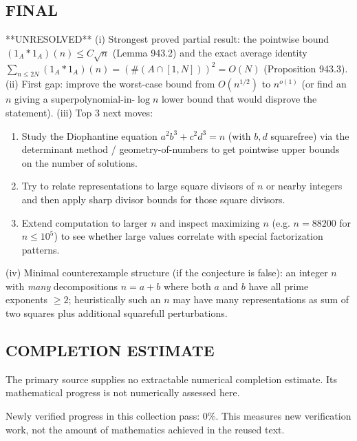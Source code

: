 \subsection*{FINAL}
**UNRESOLVED**
(i) Strongest proved partial result: the pointwise bound $(1_A*1_A)(n)\le C\sqrt{n}$ (Lemma 943.2) and the exact average identity $\sum_{n\le 2N}(1_A*1_A)(n)=(\#(A\cap[1,N]))^2=O(N)$ (Proposition 943.3).
(ii) First gap: improve the worst-case bound from $O(n^{1/2})$ to $n^{o(1)}$ (or find an $n$ giving a superpolynomial-in-$\log n$ lower bound that would disprove the statement).
(iii) Top 3 next moves:
\begin{enumerate}
\item Study the Diophantine equation $a^2b^3+c^2d^3=n$ (with $b,d$ squarefree) via the determinant method / geometry-of-numbers to get pointwise upper bounds on the number of solutions.
\item Try to relate representations to large square divisors of $n$ or nearby integers and then apply sharp divisor bounds for those square divisors.
\item Extend computation to larger $n$ and inspect maximizing $n$ (e.g. $n=88200$ for $n\le 10^5$) to see whether large values correlate with special factorization patterns.
\end{enumerate}
(iv) Minimal counterexample structure (if the conjecture is false): an integer $n$ with \emph{many} decompositions $n=a+b$ where both $a$ and $b$ have all prime exponents $\ge 2$; heuristically such an $n$ may have many representations as sum of two squares plus additional squarefull perturbations.




\subsection*{COMPLETION ESTIMATE}
The primary source supplies no extractable numerical completion estimate. Its mathematical progress is not numerically assessed here.

Newly verified progress in this collection pass: $0\%$. This measures new verification work, not the amount of mathematics achieved in the reused text.
